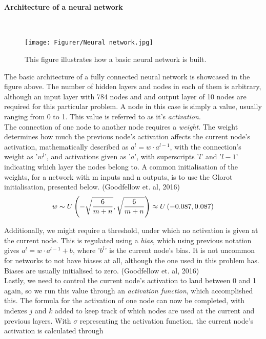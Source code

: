 \documentclass{article}
\begin{document}
\paragraph{Architecture of a neural network}\\
\hfill \break
\begin{figure}[H]
    \centering
    \texttt{[image: Figurer/Neural network.jpg]}
    \caption{This figure illustrates how a basic neural network is built.}
    \label{fig:brabild}
\end{figure}
\noindent The basic architecture of a fully connected neural network is showcased in the figure above. The number of hidden layers and nodes in each of them is arbitrary, although an input layer with 784 nodes and and output layer of 10 nodes are required for this particular problem. A node in this case is simply a value, usually ranging from 0 to 1.  This value is referred to as it's \textit{activation}. \\

\noindent The connection of one node to another node requires a \textit{weight}. The weight determines how much the previous node's activation affects the current node's activation, mathematically described as $a^l = w\cdot a^{l-1}$, with the connection's weight as '$w^l$', and activations given as '$a$', with superscripts '$l$' and '$l-1$' indicating which layer the nodes belong to. A common initialisation of the weights, for a network with m inputs and n outputs, is to use the Glorot initialisation, presented below. (Goodfellow et. al, 2016)\\
\begin{equation}\label{eq: glorot weight initialisation}
    w \thicksim U\left(-\sqrt{\frac{6}{m+n}},\sqrt{\frac{6}{m+n}}\right) \approx U\left(-0.087,0.087\right)
\end{equation}

\noindent Additionally, we might require a threshold, under which no activation is given at the current node. This is regulated using a \textit{bias}, which using previous notation gives  $a^l = w\cdot a^{l-1}+b$, where '$b^l$' is the current node's bias. It is not uncommon for networks to not have biases at all, although the one used in this problem has. Biases are usually initialised to zero. (Goodfellow et. al, 2016)\\

\noindent Lastly, we need to control the current node's activation to land between 0 and 1 again, so we run this value through an \textit{activation function}, which accomplished this. The formula for the activation of one node can now be completed, with indexes $j$ and $k$ added to keep track of which nodes are used at the current and previous layers. With $\sigma$ representing the activation function, the current node's activation is calculated through
\end{document}
